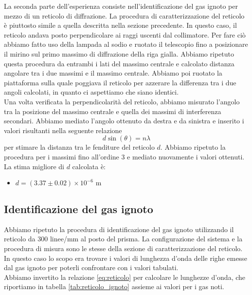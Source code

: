 \documentclass[letterpaper,12pt]{article}
\begin{document}
La seconda parte dell'esperienza consiste nell'identificazione del gas ignoto per mezzo di un reticolo di diffrazione.
La procedura di caratterizzazione del reticolo è piuttosto simile a quella descritta nella sezione precedente.
In questo caso, il reticolo andava posto perpendicolare ai raggi uscenti dal collimatore. Per fare ciò abbiamo fatto uso della lampada
al sodio e ruotato il telescopio fino a posizionare il mirino sul primo massimo di diffrazione della riga gialla.
Abbiamo ripetuto questa procedura da entrambi i lati del massimo centrale e calcolato distanza angolare tra i due massimi e il massimo centrale.
Abbiamo poi ruotato la piattaforma sulla quale poggiava il reticolo per azzerare la differenza tra i due angoli calcolati, in quanto ci aspettiamo che siano identici.\\
Una volta verificata la perpendicolarità del reticolo, abbiamo misurato l'angolo tra la posizione del massimo centrale e quella dei massimi di
interferenza secondari. Abbiamo mediato l'angolo ottenuto da destra e da sinistra e inserito i valori risultanti nella seguente relazione
\begin{equation}
    d \sin(\theta) = n \lambda
    \label{eq:reticolo}
\end{equation}
per stimare la distanza tra le fenditure del reticolo $d$. Abbiamo ripetuto la procedura per i massimi fino all'ordine 3 e mediato nuovamente
i valori ottenuti. \\
La stima migliore di $d$ calcolata è:
\begin{itemize}
    \item $d = (3.37 \pm 0.02)\times10^{-6}$ m
\end{itemize}

\subsection{Identificazione del gas ignoto}
Abbiamo ripetuto la procedura di identificazione del gas ignoto utilizzando il reticolo da 300 linee/mm al posto del 
prisma. La configurazione del sistema e la procedura di misura sono le stesse della sezione di caratterizzazione del 
reticolo. In questo caso lo scopo era trovare i valori di lunghezza d'onda delle righe emesse dal gas ignoto per poterli 
confrontare con i valori tabulati. \\
Abbiamo invertito la relazione \ref{eq:reticolo} per calcolare le lunghezze d'onda, che riportiamo in tabella \ref{tab:reticolo_ignoto} 
assieme ai valori per i gas noti.
\end{document}
